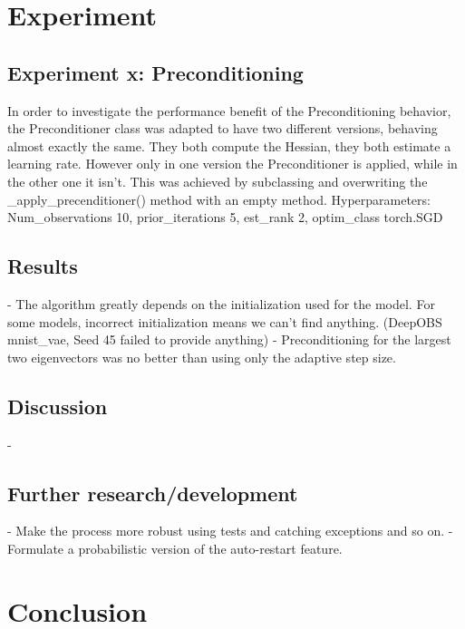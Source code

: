 \documentclass[twoside,12pt,a4paper]{report}
\begin{document}
\chapter{Experiment}
\section{Experiment x: Preconditioning}
In order to investigate the performance benefit of the Preconditioning behavior, the Preconditioner class was adapted to have two different versions, behaving almost exactly the same. They both compute the Hessian, they both estimate a learning rate. However only in one version the Preconditioner is applied, while in the other one it isn't. This was achieved by subclassing and overwriting the \_apply\_precenditioner() method with an empty method. Hyperparameters: Num\_observations 10, prior\_iterations 5, est\_rank 2, optim\_class torch.SGD


\section{Results}
\begin{markdown}
	
- The algorithm greatly depends on the initialization used for the model. For some models, incorrect initialization means we can't find anything. (DeepOBS mnist\_vae, Seed 45 failed to provide anything)
- Preconditioning for the largest two eigenvectors was no better than using only the adaptive step size.

\end{markdown}

\section{Discussion}
- 
\section{Further research/development}
- Make the process more robust using tests and catching exceptions and so on.
- Formulate a probabilistic version of the auto-restart feature.


\chapter{Conclusion}

\appendix %
\end{document}
